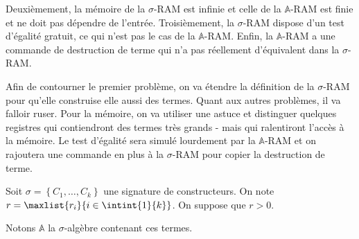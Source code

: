 \documentclass{report}
\newcommand{\bbA}{\mathbb{A}}
\begin{document}
				Deuxièmement, la mémoire de la $\sigma$-RAM est infinie et celle de la $\bbA$-RAM est finie et ne doit pas dépendre de l'entrée.
				Troisièmement, la $\sigma$-RAM dispose d'un test d'égalité gratuit, ce qui n'est pas le cas de la $\bbA$-RAM.
				Enfin, la $\bbA$-RAM a une commande de destruction de terme qui n'a pas réellement d'équivalent dans la $\sigma$-RAM. 
				
				Afin de contourner le premier problème, on va étendre la définition de la $\sigma$-RAM pour qu'elle construise elle aussi des termes. Quant aux autres problèmes, il va falloir ruser. Pour la mémoire, on va utiliser une astuce et distinguer quelques registres qui contiendront des termes très grands - mais qui ralentiront l'accès à la mémoire. Le test d'égalité sera simulé lourdement par la $\bbA$-RAM et on rajoutera une commande en plus à la $\sigma$-RAM pour copier la destruction de terme. 
				
				\espace
				
				Soit $\sigma = \left\lbrace C_1, \dots, C_k \right\rbrace$ une signature de constructeurs. On note $r = \maxlist{r_i}{i \in \intint{1}{k}}$. On suppose que $r > 0$.
				
				Notons $\bbA$ la $\sigma$-algèbre contenant ces termes.
				
\end{document}
